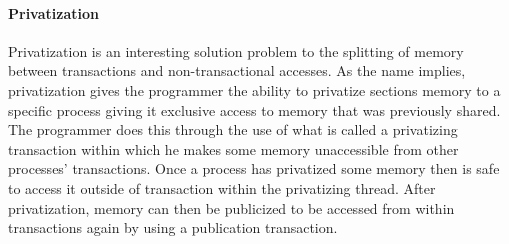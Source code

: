 \paragraph{Privatization}
Privatization is an interesting solution problem to the splitting of memory
between transactions and non-transactional accesses.
As the name implies, privatization gives the programmer the ability
to privatize sections memory to a specific process giving it exclusive access to
memory that was previously shared.
The programmer does this through the use of what is called a privatizing transaction
within which he makes some memory unaccessible from other processes' transactions.
Once a process has privatized some memory then is safe
to access it outside of transaction within the privatizing thread.
After privatization, memory can then be publicized to be accessed
from within transactions again
by using a publication transaction.

